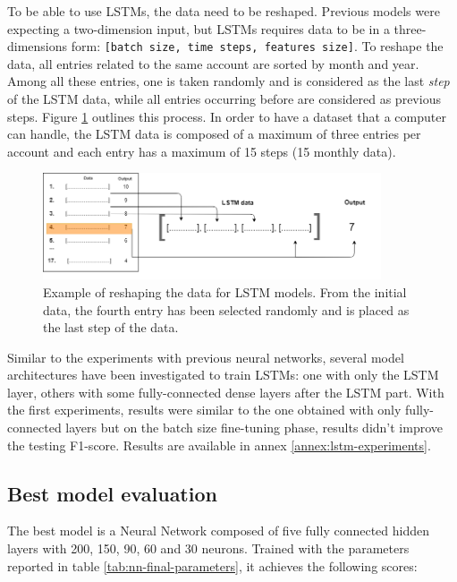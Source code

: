 To be able to use LSTMs, the data need to be reshaped. Previous models were expecting a two-dimension input, but LSTMs requires data to be in a three-dimensions form: \texttt{[batch size, time steps, features size]}. To reshape the data, all entries related to the same account are sorted by month and year. Among all these entries, one is taken randomly and is considered as the last \textit{step} of the LSTM data, while all entries occurring before are considered as previous steps. Figure \ref{fig:lst-data-build} outlines this process. In order to have a dataset that a computer can handle, the LSTM data is composed of a maximum of three entries per account and each entry has a maximum of 15 steps (15 monthly data).

\begin{figure}[htbp]
    \centering
    \includegraphics[width=10cm]{images/lstm-data-build.png}
    \caption[LSTM data build]{Example of reshaping the data for LSTM models. From the initial data, the fourth entry has been selected randomly and is placed as the last step of the data.}
    \label{fig:lst-data-build}
\end{figure}

Similar to the experiments with previous neural networks, several model architectures have been investigated to train LSTMs: one with only the LSTM layer, others with some fully-connected dense layers after the LSTM part. With the first experiments, results were similar to the one obtained with only fully-connected layers but on the batch size fine-tuning phase, results didn't improve the testing F1-score. Results are available in annex \ref{annex:lstm-experiments}.



\subsection{Best model evaluation}
\label{sec:best-model}

The best model is a Neural Network composed of five fully connected hidden layers with 200, 150, 90, 60 and 30 neurons. Trained with the parameters reported in table \ref{tab:nn-final-parameters}, it achieves the following scores:

